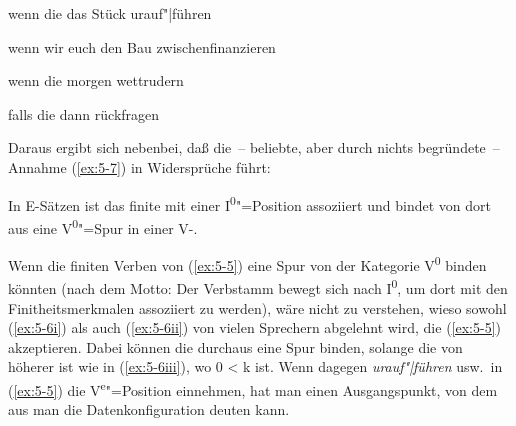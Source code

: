\documentclass[output=paper]{LSP/langsci}
\begin{document}
\begin{exe}
\ex%
\label{ex:5-5}
\begin{xlist}
\ex%
\label{ex:5-5a}
wenn die das Stück urauf"|führen

\ex%
\label{ex:5-5b}
wenn wir euch den Bau zwischenfinanzieren

\ex%
\label{ex:5-5c}
wenn die morgen wettrudern

\ex%
\label{ex:5-5d}
falls die dann rückfragen
\end{xlist}

\ex%
\label{ex:5-6}
\begin{xlisti}
\ex%
\label{ex:5-6i}
\begin{xlista}
\end{xlista}
\ex%
\label{ex:5-6ii}
\begin{xlista}
\end{xlista}
\end{xlisti}
\end{exe}
Daraus ergibt sich nebenbei, daß die~-- beliebte, aber durch nichts begründete~-- Annahme (\ref{ex:5-7}) in Widersprüche führt:

\begin{exe}
\ex%
\label{ex:5-7}
In E-Sätzen ist das finite  mit einer I\textsuperscript{0}{}"=Position assoziiert und bindet von dort aus eine V\textsuperscript{0}{}"=Spur in einer V-.
\end{exe}
Wenn die finiten Verben von (\ref{ex:5-5}) eine Spur von der Kategorie V\textsuperscript{0} binden könnten (nach dem Motto: Der Verbstamm bewegt sich nach I\textsuperscript{0}, um dort mit den Finitheitsmerkmalen assoziiert zu werden), wäre nicht zu verstehen, wieso sowohl (\ref{ex:5-6i}) als auch (\ref{ex:5-6ii}) von vielen Sprechern abgelehnt wird, die (\ref{ex:5-5}) akzeptieren. Dabei können die  durchaus eine Spur binden, solange die von höherer  ist wie in (\ref{ex:5-6iii}), wo 0 {\textless} k ist. Wenn dagegen \textit{urauf"|führen} usw.\ in (\ref{ex:5-5}) die V\textsuperscript{e}{}"=Position einnehmen, hat man einen Ausgangspunkt, von dem aus man die Datenkonfiguration deuten kann.
\end{document}
